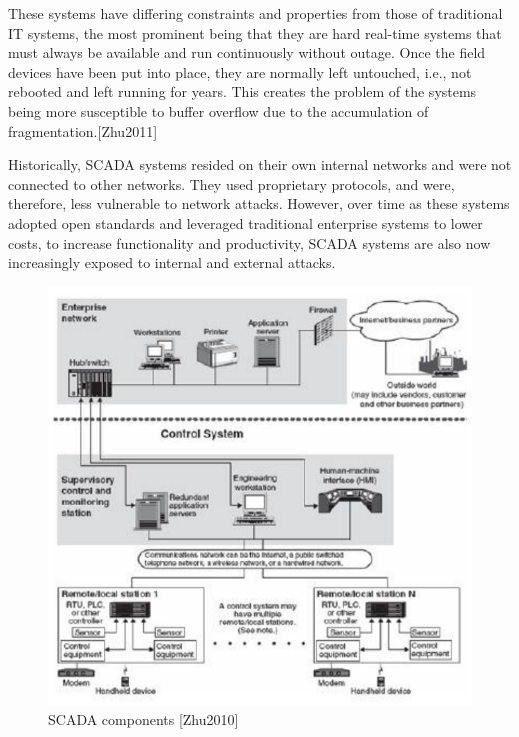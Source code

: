 \documentclass[12pt,]{article}
\begin{document}
These systems have differing constraints and properties from those of
traditional IT systems, the most prominent being that they are hard
real-time systems that must always be available and run continuously
without outage. Once the field devices have been put into place, they
are normally left untouched, i.e., not rebooted and left running for
years. This creates the problem of the systems being more susceptible to
buffer overflow due to the accumulation of fragmentation.{[}Zhu2011{]}

Historically, SCADA systems resided on their own internal networks and
were not connected to other networks. They used proprietary protocols,
and were, therefore, less vulnerable to network attacks. However, over
time as these systems adopted open standards and leveraged traditional
enterprise systems to lower costs, to increase functionality and
productivity, SCADA systems are also now increasingly exposed to
internal and external attacks.

\begin{figure}

{\centering \includegraphics{thesis_files/figure-latex/unnamed-chunk-5-1} 

}

\caption{SCADA components [Zhu2010]}\label{fig:unnamed-chunk-5}
\end{figure}
\end{document}
